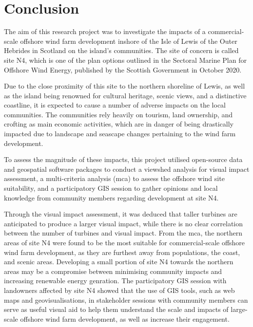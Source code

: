 \chapter{Conclusion}

The aim of this research project was to investigate the impacts of a
commercial-scale offshore wind farm development inshore of the Isle of Lewis of
the Outer Hebrides in Scotland on the island's communities. The site of concern
is called site N4, which is one of the plan options outlined in the Sectoral
Marine Plan for Offshore Wind Energy, published by the Scottish Government in
October 2020.

Due to the close proximity of this site to the northern shoreline of Lewis, as
well as the island being renowned for cultural heritage, scenic views, and a
distinctive coastline, it is expected to cause a number of adverse impacts on
the local communities. The communities rely heavily on tourism, land ownership,
and crofting as main economic activities, which are in danger of being
drastically impacted due to landscape and seascape changes pertaining to the
wind farm development.

To assess the magnitude of these impacts, this project utilised open-source
data and geospatial software packages to conduct a viewshed analysis for visual
impact assessment, a multi-criteria analysis (\gls{mca}) to assess the offshore
wind site suitability, and a participatory GIS session to gather opinions and
local knowledge from community members regarding development at site N4.

Through the visual impact assessment, it was deduced that taller turbines are
anticipated to produce a larger visual impact, while there is no clear
correlation between the number of turbines and visual impact. From the
\gls{mca}, the northern areas of site N4 were found to be the most suitable for
commercial-scale offshore wind farm development, as they are furthest away from
populations, the coast, and scenic areas. Developing a small portion of site N4
towards the northern areas may be a compromise between minimising community
impacts and increasing renewable energy genration. The participatory GIS
session with landowners affected by site N4 showed that the use of GIS tools,
such as web maps and geovisualisations, in stakeholder sessions with community
members can serve as useful visual aid to help them understand the scale and
impacts of large-scale offshore wind farm development, as well as increase
their engagement.
